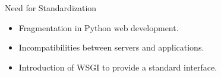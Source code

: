 \documentclass{beamer}
\begin{document}
\begin{frame}{Need for Standardization}
    \begin{itemize}
        \item Fragmentation in Python web development.
        \item Incompatibilities between servers and applications.
        \item Introduction of WSGI to provide a standard interface.
    \end{itemize}
\end{frame}

%
%
%
\end{document}
